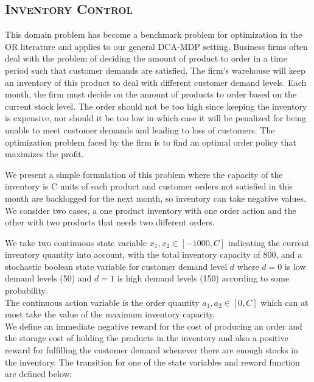 \documentclass[letterpaper]{article}
\newcommand{\InventoryControl}{\textsc{Inventory Control}}
\begin{document}
\subsection{\InventoryControl} 
This domain problem has become a benchmark problem for optimization in the OR literature and applies to our general DCA-MDP setting. Business firms often deal with the problem of deciding  the amount of product to order in a time period such that customer demands are satisfied. The firm's warehouse will keep an inventory of this product to deal with different customer demand levels. Each month, the firm must decide on the amount of products to order based on the current stock level.
The order should not be too high since keeping the inventory is expensive, nor should it be too low in which case it will be penalized for being unable to meet customer demands and leading to loss of customers. The optimization problem faced by the firm is to find an optimal order policy that maximizes the profit.

We present a simple formulation of this problem where the capacity of the inventory is C units of each product and customer orders not satisfied in this month are backlogged for the next month, so inventory can take negative values. We consider two cases, a one product inventory with one order action and the other with two products that needs two different orders.

We take two continuous state variable $x_1,x_2 \in [-1000,C]$ indicating the current inventory quantity into account, with the total inventory capacity of 800, and a stochastic boolean state variable for customer demand level $d$ where $d=0$ is low demand levels (50) and $d=1$ is high demand levels (150) according to some probability. \\
The continuous action variable is the order quantity $a_1,a_2 \in [0,C]$ which can at most take the value of the maximum inventory capacity. \\

We define an immediate negative reward for the cost of producing an order and the storage cost of holding the products in the inventory and also a positive reward for fulfilling the customer demand whenever there are enough stocks in the inventory. The transition for one of the state variables and reward function are defined below:
\end{document}

